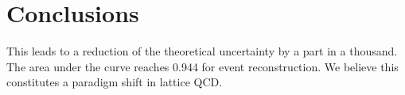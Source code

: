 \section{Conclusions}\label{sec:conclusions}

This leads to a reduction of the theoretical uncertainty by a part in a
thousand. The area under the curve reaches 0.944 for event
reconstruction. We believe this constitutes a paradigm shift in lattice
QCD.

